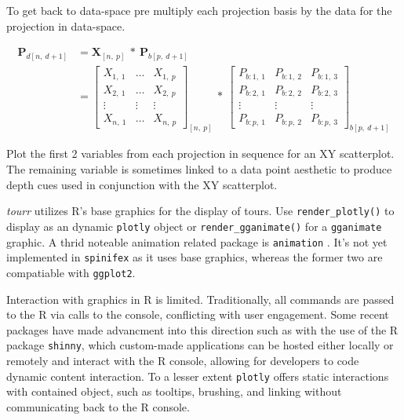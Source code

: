 \documentclass{monashthesis}
\begin{document}
To get back to data-space pre multiply each projection basis by the data for the projection in data-space.

\begin{align}
  \textbf{P}_{d[n,~d+1]}
    &= \textbf{X}_{[n,~p]} ~*~ \textbf{P}_{b[p,~d+1]} \\
    &= \begin{bmatrix}
      X_{1,~1} & \dots & X_{1,~p} \\
      X_{2,~1} & \dots & X_{2,~p} \\
      \vdots   & \vdots & \vdots  \\
      X_{n,~1} & \dots & X_{n,~p}
    \end{bmatrix}_{[n,~p]}
      ~*~
    \begin{bmatrix}
      P_{b:1,~1} & P_{b:1,~2} & P_{b:1,~3} \\
      P_{b:2,~1} & P_{b:2,~2} & P_{b:2,~3} \\
      \vdots     & \vdots     & \vdots     \\
      P_{b:p,~1} & P_{b:p,~2} & P_{b:p,~3}
    \end{bmatrix}_{b[p,~d+1]}
\end{align}

Plot the first 2 variables from each projection in sequence for an XY scatterplot. The remaining variable is sometimes linked to a data point aesthetic to produce depth cues used in conjunction with the XY scatterplot.

\emph{tourr} utilizes R's base graphics for the display of tours. Use \texttt{render\_plotly()} to display as an dynamic \texttt{plotly} \textcite{sievert_plotly_2018} object or \texttt{render\_gganimate()} for a \texttt{gganimate} \textcite{pedersen_gganimate:_2019} graphic. A thrid noteable animation related package is \texttt{animation} \textcite{xie_animation:_2018}. It's not yet implemented in \texttt{spinifex} as it uses base graphics, whereas the former two are compatiable with \texttt{ggplot2}.

Interaction with graphics in R is limited. Traditionally, all commands are passed to the R via calls to the console, conflicting with user engagement. Some recent packages have made advancment into this direction such as with the use of the R package \texttt{shinny}, which custom-made applications can be hosted either locally or remotely and interact with the R console, allowing for developers to code dynamic content interaction. To a lesser extent \texttt{plotly} offers static interactions with contained object, such as tooltips, brushing, and linking without communicating back to the R console.
\end{document}
